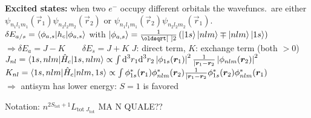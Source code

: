 \begin{squishlist}
    \item \textbf{Excited states:} when two $e^-$ occupy different orbitals the wavefuncs.\ are either
    $\psi_{n_1l_1m_1}(\vec{r}_1) \psi_{n_2l_2m_2}(\vec{r}_2)$ or $\psi_{n_1l_1m_1}(\vec{r}_2) \psi_{n_2l_2m_2}(\vec{r}_1)$. \\
    $\delta E_{a/s} = \braket{\phi_{a,s}|h_c|\phi_{a,s}}$ with
    $\ket{\phi_{a,s}} = \frac{1}{\sqrt{2}} \left( \ket{1s}\ket{nlm} \mp \ket{n l m}\ket{1s}\right)$ \\
    $\Rightarrow \delta E_a = J - K \qquad \delta E_s = J + K$ \qquad $J$: direct term, $K$: exchange term (both $> 0$) \\
    $J_{nl} = \braket{1s,nlm|\hat{H}_c|1s, nlm} \propto \int \textrm{d}^3 r_1 \textrm{d}^3 r_2 \left|\phi_{1s}(\bm{r}_1)\right|^2 \frac{1}{|\bm{r}_1 - \bm{r}_2} \left|\phi_{nlm}(\bm{r}_2)\right|^2$ \\
    $K_{nl} = \braket{1s,nlm|\hat{H}_c|nlm,1s} \propto \int \phi_{1s}^*(\bm{r}_1) \phi_{nlm}^*(\bm{r}_2) \frac{1}{|\bm{r}_1 - \bm{r}_2}\phi_{1s}^*(\bm{r}_2) \phi_{nlm}^*(\bm{r}_1) $ \\
    $\Longrightarrow$ antisym has lower energy: $S=1$ is favored

    \item Notation: $n^{2S_{\text{tot}}+1} L_{\text{tot}\; J_{\text{tot}}}$ MA N QUALE??
\end{squishlist}

